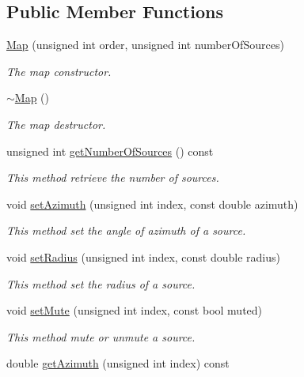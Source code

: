 \subsection*{Public Member Functions}
\begin{DoxyCompactItemize}
\item 
\hyperlink{class_hoa2_d_1_1_map_a22720e5b9ab041bb970d4dc43086558c}{Map} (unsigned int order, unsigned int number\-Of\-Sources)
\begin{DoxyCompactList}\small\item\em The map constructor. \end{DoxyCompactList}\item 
\hyperlink{class_hoa2_d_1_1_map_a47d01e332e6c19015e9fd94e8898f4f3}{$\sim$\-Map} ()
\begin{DoxyCompactList}\small\item\em The map destructor. \end{DoxyCompactList}\item 
unsigned int \hyperlink{class_hoa2_d_1_1_map_aef1bab3391d2292182a9b8205200e9af}{get\-Number\-Of\-Sources} () const 
\begin{DoxyCompactList}\small\item\em This method retrieve the number of sources. \end{DoxyCompactList}\item 
void \hyperlink{class_hoa2_d_1_1_map_a0b98a9ad8d1fda90fe5559fd7736050b}{set\-Azimuth} (unsigned int index, const double azimuth)
\begin{DoxyCompactList}\small\item\em This method set the angle of azimuth of a source. \end{DoxyCompactList}\item 
void \hyperlink{class_hoa2_d_1_1_map_a66b18d42476bb3d92c816173c9fc41a4}{set\-Radius} (unsigned int index, const double radius)
\begin{DoxyCompactList}\small\item\em This method set the radius of a source. \end{DoxyCompactList}\item 
void \hyperlink{class_hoa2_d_1_1_map_ae1ff77cc8681ee9870dc2d27ebaaaecd}{set\-Mute} (unsigned int index, const bool muted)
\begin{DoxyCompactList}\small\item\em This method mute or unmute a source. \end{DoxyCompactList}\item 
double \hyperlink{class_hoa2_d_1_1_map_a79310ad84032e8dfd918d927dcd76a01}{get\-Azimuth} (unsigned int index) const 

\end{DoxyCompactItemize}
